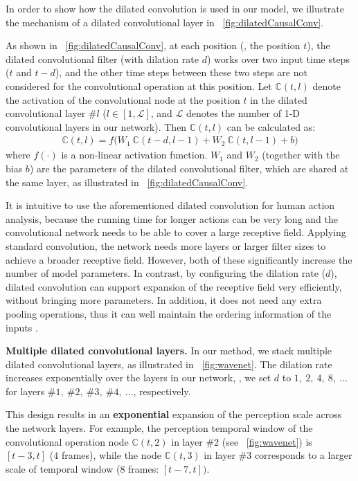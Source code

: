 \documentclass[10pt,twocolumn,letterpaper]{article}
\begin{document}
In order to show how the dilated convolution is used in our model,
we illustrate the mechanism of a dilated convolutional layer in \figurename{~\ref{fig:dilatedCausalConv}}.

As shown in \figurename{~\ref{fig:dilatedCausalConv}},
at each position (\eg, the position $t$), the dilated convolutional filter (with dilation rate $d$) works over two input time steps ($t$ and $t-d$),
and the other time steps between these two steps are not considered for the convolutional operation at this position.
Let $\mathbb{C}(t,l)$ denote the activation of the convolutional node at the position $t$ in the dilated convolutional layer \#$l$
($l \in [1,\mathcal{L}]$, and $\mathcal{L}$ denotes the number of 1-D convolutional layers in our network).
Then $\mathbb{C}(t,l)$ can be calculated as:
\begin{eqnarray}
\mathbb{C}(t,l) = f \Big( W_{1} ~ \mathbb{C}(t-d,l-1) + W_{2} ~ \mathbb{C}(t,l-1) + b \Big)
\label{eq:C_tl}
\end{eqnarray}
where $f(\cdot)$ is a non-linear activation function.
$W_{1}$ and $W_{2}$ (together with the bias $b$) are the parameters of the dilated convolutional filter,
which are shared at the same layer, as illustrated in \figurename{~\ref{fig:dilatedCausalConv}}.


It is intuitive to use the aforementioned dilated convolution for human action analysis,
because the running time for longer actions can be very long and the convolutional network needs to be able to cover a large receptive field.
Applying standard convolution,
the network needs more layers or larger filter sizes to achieve a broader receptive field.
However, both of these significantly increase the number of model parameters.
In contrast,
by configuring the dilation rate ($d$),
dilated convolution can support expansion of the receptive field very efficiently, without bringing more parameters.
In addition, it does not need any extra pooling operations,
thus it can well maintain the ordering information of the inputs \cite{YuKoltun2016}.


\textbf{Multiple dilated convolutional layers.}
In our method, we stack multiple dilated convolutional layers, as illustrated in \figurename{~\ref{fig:wavenet}}.
The dilation rate increases exponentially over the layers in our network,
\ie, we set $d$ to $1,~2,~4,~8,~...$ for layers \#$1,~$\#$2,~$\#$3,~$\#$4,~...$, respectively.

This design results in an \textbf{exponential} expansion of the perception scale across the network layers.
For example,
the perception temporal window of the convolutional operation node $\mathbb{C}(t,2)$ in layer \#2 (see \figurename{~\ref{fig:wavenet}}) is $[t-3,t]$ ($4$ frames),
while the node $\mathbb{C}(t,3)$ in layer \#3 corresponds to a larger scale of temporal window ($8$ frames: $[t-7,t])$.
\end{document}
